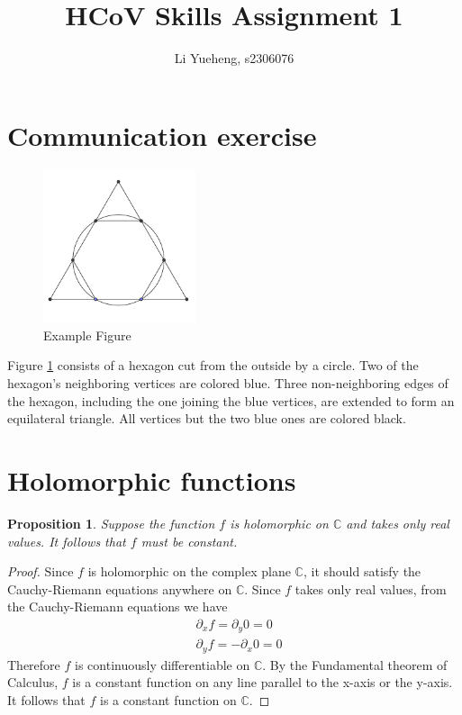 \documentclass[a4paper,11pt]{article}
\title{HCoV Skills Assignment 1}
\author{Li Yueheng, s2306076}
\newtheorem{prop}{Proposition}
\begin{document}
\maketitle



\section{Communication exercise} %

\begin{figure}[h]\label{fig_example_figure}
    \centering
    \includegraphics[width=0.4\textwidth]{d7.png}
    \caption{Example Figure}
\end{figure}

Figure \ref{fig_example_figure} consists of a hexagon cut from the outside by a circle. Two of the hexagon's neighboring  vertices are colored blue. Three non-neighboring edges of the hexagon, including the one joining the blue vertices, are extended to form an equilateral triangle. All vertices but the two blue ones are colored black.




\section{Holomorphic functions}

\begin{prop}\label{prop:fCtoRconst} %
Suppose the function \( f \) is holomorphic on \( \mathbb{C} \) and takes only real values. It follows that \( f \) must be constant.
\end{prop}

\begin{proof}
Since $f$ is holomorphic on the complex plane $\mathbb{C}$, it should satisfy the Cauchy-Riemann equations anywhere on $\mathbb{C}$. Since $f$ takes only real values, from the Cauchy-Riemann equations we have
\begin{align*}
	&\partial_x f=\partial_y 0=0 \\
	&\partial_y f=-\partial_x 0 =0
\end{align*}
Therefore $f$ is continuously differentiable on $\mathbb{C}$. By the Fundamental theorem of Calculus, $f$ is a constant function on any line parallel to the x-axis or the y-axis. It follows that $f$ is a constant function on $\mathbb{C}$.
\end{proof}
\end{document}

